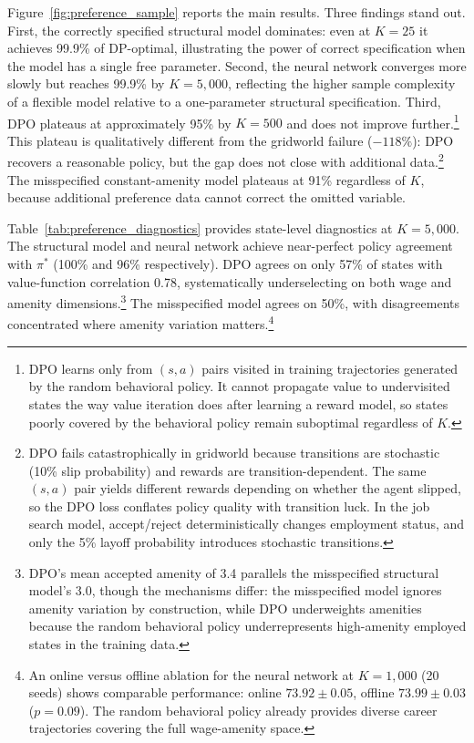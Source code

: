 Figure~\ref{fig:preference_sample} reports the main results. Three findings stand out. First, the correctly specified structural model dominates: even at $K = 25$ it achieves 99.9\% of DP-optimal, illustrating the power of correct specification when the model has a single free parameter. Second, the neural network converges more slowly but reaches 99.9\% by $K = 5{,}000$, reflecting the higher sample complexity of a flexible model relative to a one-parameter structural specification. Third, DPO plateaus at approximately 95\% by $K = 500$ and does not improve further.\footnote{DPO learns only from $(s,a)$ pairs visited in training trajectories generated by the random behavioral policy. It cannot propagate value to undervisited states the way value iteration does after learning a reward model, so states poorly covered by the behavioral policy remain suboptimal regardless of $K$.} This plateau is qualitatively different from the gridworld failure ($-118\%$): DPO recovers a reasonable policy, but the gap does not close with additional data.\footnote{DPO fails catastrophically in gridworld because transitions are stochastic (10\% slip probability) and rewards are transition-dependent. The same $(s,a)$ pair yields different rewards depending on whether the agent slipped, so the DPO loss conflates policy quality with transition luck. In the job search model, accept/reject deterministically changes employment status, and only the 5\% layoff probability introduces stochastic transitions.} The misspecified constant-amenity model plateaus at 91\% regardless of $K$, because additional preference data cannot correct the omitted variable.

\begin{table}[htbp]
\centering
\caption{Diagnostics at $K = 5{,}000$ (single seed): policy agreement with $\pi^*$, value-function correlation, and mean accepted wage and amenity for each method.}
\label{tab:preference_diagnostics}

\end{table}

Table~\ref{tab:preference_diagnostics} provides state-level diagnostics at $K = 5{,}000$. The structural model and neural network achieve near-perfect policy agreement with $\pi^*$ (100\% and 96\% respectively). DPO agrees on only 57\% of states with value-function correlation 0.78, systematically underselecting on both wage and amenity dimensions.\footnote{DPO's mean accepted amenity of 3.4 parallels the misspecified structural model's 3.0, though the mechanisms differ: the misspecified model ignores amenity variation by construction, while DPO underweights amenities because the random behavioral policy underrepresents high-amenity employed states in the training data.} The misspecified model agrees on 50\%, with disagreements concentrated where amenity variation matters.\footnote{An online versus offline ablation for the neural network at $K = 1{,}000$ (20 seeds) shows comparable performance: online $73.92 \pm 0.05$, offline $73.99 \pm 0.03$ ($p = 0.09$). The random behavioral policy already provides diverse career trajectories covering the full wage-amenity space.}

